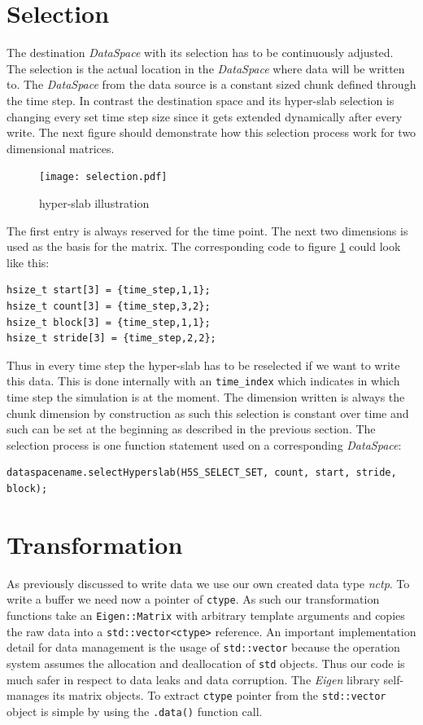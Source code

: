 \section{Selection}
\label{seq:selection}
The destination \textit{DataSpace} with its selection has to be continuously adjusted. The selection is the actual location in the \textit{DataSpace} where data will be written to. 
The \textit{DataSpace} from the data source is a constant sized chunk defined through the time step. In contrast the destination space and its hyper-slab selection is changing every set time step size since it gets extended dynamically after every write. The next figure should demonstrate how this selection process work for two dimensional matrices.

\begin{figure}[ht!]
\centering
\texttt{[image: selection.pdf]}
\caption{hyper-slab illustration}
\label{fig:hyperslab}
\end{figure}
The first entry is always reserved for the time point. The next two dimensions is used as the basis for the matrix. The corresponding code to figure \ref{fig:hyperslab} could look like this:
\begin{lstlisting}
hsize_t start[3] = {time_step,1,1};
hsize_t count[3] = {time_step,3,2};
hsize_t block[3] = {time_step,1,1};
hsize_t stride[3] = {time_step,2,2};
\end{lstlisting}
Thus in every time step the hyper-slab has to be reselected if we want to write this data. This is done internally with an \texttt{time\_index} which indicates in which time step the simulation is at the moment. The dimension written is always the chunk dimension by construction as such this selection is constant over time and such can be set at the beginning as described in the previous section.
The selection process is one function statement used on a corresponding \textit{DataSpace}:
\begin{lstlisting}
dataspacename.selectHyperslab(H5S_SELECT_SET, count, start, stride, block);
\end{lstlisting}

\section{Transformation}
As previously discussed to write data we use our own created data type \textit{nctp}. To write a buffer we need now a pointer of \texttt{ctype}. As such our transformation functions take an \texttt{Eigen::Matrix} with arbitrary template arguments and copies the raw data into a \texttt{std::vector<ctype>} reference. An important implementation detail for data management is the usage of \texttt{std::vector} because the operation system assumes the allocation and deallocation of \texttt{std} objects. Thus our code is much safer in respect to data leaks and data corruption. The \textit{Eigen} library self-manages its matrix objects. To extract \texttt{ctype} pointer from the \texttt{std::vector} object is simple by using the \texttt{.data()} function call.

